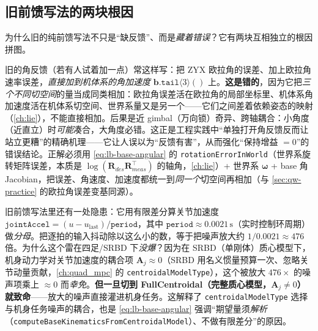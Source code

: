 \subsection{旧前馈写法的两块根因}
\label{subsec:lb-two-bugs}

为什么旧的纯前馈写法不只是“缺反馈”、而是\emph{藏着错误}？它有两块互相独立的根因拼图。

\begin{pitfall}[根因一（frame bug）：把欧拉角误差直接加到机体系角加速度 = 三切空间相加]\label{pit:lb-frame-bug}
旧的角反馈（若有人试着加一点）常这样写：把 ZYX 欧拉角的误差、加上欧拉角速率误差，\emph{直接加到机体系的角加速度} $\mathbf{b}.\texttt{tail}\langle3\rangle()$ 上。\textbf{这是错的}，因为它把\emph{三个不同切空间}的量当成同类相加：欧拉角误差活在欧拉角的局部坐标里、机体系角加速度活在机体系切空间、世界系量又是另一个——它们之间差着依赖姿态的映射（\cref{ch:lie}），不能直接相加。后果是近 gimbal（万向锁）奇异、跨轴耦合：小角度（近直立）时\emph{可能}凑合，大角度必错。这正是工程实践中“单独打开角反馈反而让站立更糟”的精确机理——它让人误以为“反馈有害”，从而强化“保持增益 $=0$”的错误结论。正解必须用 \cref{eq:lb-base-angular} 的 \texttt{rotationErrorInWorld}（世界系旋转矩阵误差，本质是 $\log(\mathbf{R}_{des}\mathbf{R}_{meas}^\top)$ 的轴角，\cref{ch:lie}）+ 世界系 $\boldsymbol\omega$ + base 角 Jacobian，把误差、角速度、加速度都统一到\emph{同一个}切空间再相加（与 \cref{sec:qw-practice} 的欧拉角误差变基同源）。
\end{pitfall}

\begin{pitfall}\label{pit:lb-finite-diff}
旧前馈写法里还有一处隐患：它用有限差分算关节加速度 $\texttt{jointAccel}=(u-u_{\mathrm{last}})/\texttt{period}$，其中 $\texttt{period}\approx 0.0021\,\mathrm{s}$（实时控制环周期）做\emph{分母}。把逐拍的输入抖动除以这么小的数，等于把噪声放大约 $1/0.0021\approx 476$ 倍。为什么这个雷在四足/SRBD 下\emph{没爆}？因为在 SRBD（单刚体）质心模型下，机身动力学对关节加速度的耦合项 $\mathbf{A}_j\approx 0$（SRBD 用名义惯量预算一次、忽略关节动量贡献，\cref{ch:quad_mpc} 的 \texttt{centroidalModelType}），这个被放大 $476\times$ 的噪声项乘上 $\approx 0$ 而\emph{幸免}。\textbf{但一旦切到 FullCentroidal（完整质心模型，$\mathbf{A}_j\ne 0$）就致命}——放大的噪声直接灌进机身任务。这解释了 \texttt{centroidalModelType} 选择与机身任务噪声的耦合，也是 \cref{eq:lb-base-angular} 强调“期望量须\emph{解析}（\texttt{computeBaseKinematicsFromCentroidalModel}）、不做有限差分”的原因。
\end{pitfall}

